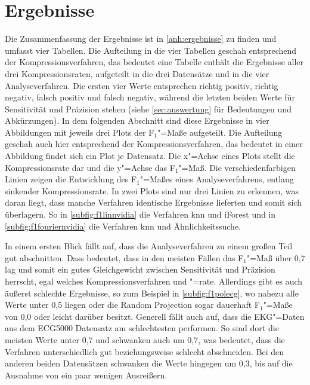 \section{Ergebnisse}
Die Zusammenfassung der Ergebnisse ist in \autoref{anh:ergebnisse} zu finden und umfasst vier Tabellen. Die Aufteilung in die vier Tabellen geschah entsprechend der Kompressionsverfahren, das bedeutet eine Tabelle enthält die Ergebnisse aller drei Kompressionsraten, aufgeteilt in die drei Datensätze und in die vier Analyseverfahren. Die ersten vier Werte entsprechen richtig positiv, richtig negativ, falsch positiv und falsch negativ, während die letzten beiden Werte für Sensitivität und Präzision stehen (siehe \autoref{sec:auswertung} für Bedeutungen und Abkürzungen). In dem folgenden Abschnitt sind diese Ergebnisse in vier Abbildungen mit jeweils drei Plots der F$_1$"=Maße aufgeteilt. Die Aufteilung geschah auch hier entsprechend der Kompressionsverfahren, das bedeutet in einer Abbildung findet sich ein Plot je Datensatz. Die x"=Achse eines Plots stellt die Kompressionsrate dar und die y"=Achse das F$_1$"=Maß. Die verschiedenfarbigen Linien zeigen die Entwicklung des F$_1$"=Maßes eines Analyseverfahrens, entlang sinkender Kompressionsrate. In zwei Plots sind nur drei Linien zu erkennen, was daran liegt, dass manche Verfahren identische Ergebnisse lieferten und somit sich überlagern. So in \autoref{subfig:f1linnvidia} die Verfahren knn und iForest und in \autoref{subfig:f1fouriernvidia} die Verfahren knn und Ähnlichkeitssuche.

In einem ersten Blick fällt auf, dass die Analyseverfahren zu einem großen Teil gut abschnitten. Dass bedeutet, dass in den meisten Fällen das F$_1$"=Maß über 0,7 lag und somit ein gutes Gleichgewicht zwischen Sensitivität und Präzision herrscht, egal welches Kompressionsverfahren und "=rate. Allerdings gibt es auch äußerst schlechte Ergebnisse, so zum Beispiel in \autoref{subfig:f1polecg}, wo nahezu alle Werte unter 0,5 liegen oder die Random Projection sogar dauerhaft F$_1$"=Maße von 0,0 oder leicht darüber besitzt. Generell fällt auch auf, dass die EKG"=Daten aus dem ECG5000 Datensatz am schlechtesten performen. So sind dort die meisten Werte unter 0,7 und schwanken auch um 0,7, was bedeutet, dass die Verfahren unterschiedlich gut beziehungsweise schlecht abschneiden. Bei den anderen beiden Datensätzen schwanken die Werte hingegen um 0,3, bis auf die Ausnahme von ein paar wenigen Ausreißern.

